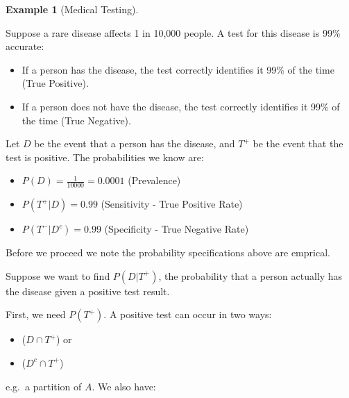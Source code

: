 \documentclass[
  letterpaper,
  DIV=11,
  numbers=noendperiod]{scrreport}
\providecommand{\tightlist}{%
  \setlength{\itemsep}{0pt}\setlength{\parskip}{0pt}}
\theoremstyle{definition}
\newtheorem{example}{Example}[chapter]
\theoremstyle{plain}
\theoremstyle{plain}
\theoremstyle{definition}
\theoremstyle{remark}
\begin{document}
\begin{tcolorbox}[enhanced jigsaw, opacitybacktitle=0.6, bottomtitle=1mm, opacityback=0, toprule=.15mm, colbacktitle=quarto-callout-note-color!10!white, colback=white, left=2mm, title={Example of Law of Total Probability and Bayes' Rule}, breakable, rightrule=.15mm, leftrule=.75mm, titlerule=0mm, colframe=quarto-callout-note-color-frame, arc=.35mm, coltitle=black, toptitle=1mm, bottomrule=.15mm]

\begin{example}[Medical
Testing]\protect\hypertarget{exm-total-probability-bayes}{}\label{exm-total-probability-bayes}

Suppose a rare disease affects 1 in 10,000 people. A test for this
disease is 99\% accurate:

\begin{itemize}
\tightlist
\item
  If a person has the disease, the test correctly identifies it 99\% of
  the time (True Positive).
\item
  If a person does not have the disease, the test correctly identifies
  it 99\% of the time (True Negative).
\end{itemize}

Let \(D\) be the event that a person has the disease, and \(T^+\) be the
event that the test is positive. The probabilities we know are:

\begin{itemize}
\tightlist
\item
  \(P(D) = \frac{1}{10000} = 0.0001\) (Prevalence)
\item
  \(P(T^+|D) = 0.99\) (Sensitivity - True Positive Rate)
\item
  \(P(T^-|D^c) = 0.99\) (Specificity - True Negative Rate)
\end{itemize}

Before we proceed we note the probability specifications above are
emprical.

Suppose we want to find \(P(D|T^+)\), the probability that a person
actually has the disease given a positive test result.

First, we need \(P(T^+)\). A positive test can occur in two ways:

\begin{itemize}
\item
  (\(D \cap T^+\)) or
\item
  (\(D^c \cap T^+\))
\end{itemize}

e.g.~a partition of \(A\). We also have:


\end{example}
\end{tcolorbox}
\end{document}
